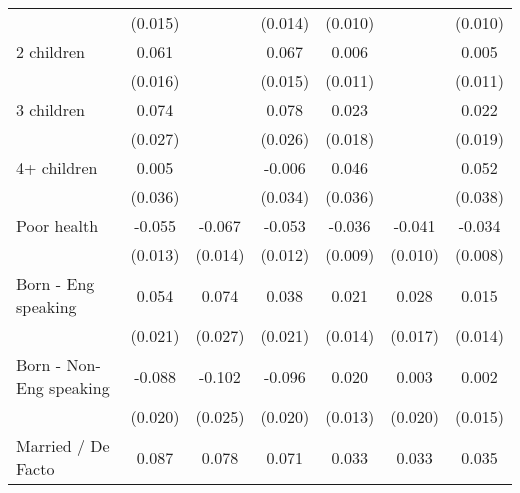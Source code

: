 {\begin{tabular}{l*{6}{c}}
                    &     (0.015)         &                     &     (0.014)         &     (0.010)         &                     &     (0.010)         \\
2 children          &       0.061\sym{***}&                     &       0.067\sym{***}&       0.006         &                     &       0.005         \\
                    &     (0.016)         &                     &     (0.015)         &     (0.011)         &                     &     (0.011)         \\
3 children          &       0.074\sym{***}&                     &       0.078\sym{***}&       0.023         &                     &       0.022         \\
                    &     (0.027)         &                     &     (0.026)         &     (0.018)         &                     &     (0.019)         \\
4+ children         &       0.005         &                     &      -0.006         &       0.046         &                     &       0.052         \\
                    &     (0.036)         &                     &     (0.034)         &     (0.036)         &                     &     (0.038)         \\
Poor health         &      -0.055\sym{***}&      -0.067\sym{***}&      -0.053\sym{***}&      -0.036\sym{***}&      -0.041\sym{***}&      -0.034\sym{***}\\
                    &     (0.013)         &     (0.014)         &     (0.012)         &     (0.009)         &     (0.010)         &     (0.008)         \\
Born - Eng speaking &       0.054\sym{***}&       0.074\sym{***}&       0.038\sym{*}  &       0.021         &       0.028\sym{*}  &       0.015         \\
                    &     (0.021)         &     (0.027)         &     (0.021)         &     (0.014)         &     (0.017)         &     (0.014)         \\
Born - Non-Eng speaking&      -0.088\sym{***}&      -0.102\sym{***}&      -0.096\sym{***}&       0.020         &       0.003         &       0.002         \\
                    &     (0.020)         &     (0.025)         &     (0.020)         &     (0.013)         &     (0.020)         &     (0.015)         \\
Married / De Facto  &       0.087\sym{***}&       0.078\sym{***}&       0.071\sym{***}&       0.033\sym{***}&       0.033\sym{**} &       0.035\sym{***}\\

\end{tabular}}
